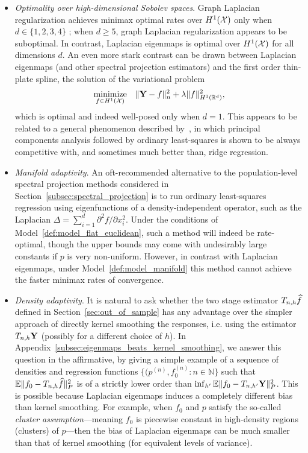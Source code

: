 \begin{itemize}
	\item \emph{Optimality over high-dimensional Sobolev spaces}. Graph Laplacian regularization achieves minimax optimal rates over $H^1(\mathcal{X})$ only when $d \in \{1,2,3,4\}$ \citep{sadhanala16, green2021}; when $d \geq 5$, graph Laplacian regularization appears to be suboptimal. In contrast, Laplacian eigenmaps is optimal over $H^1(\mathcal{X})$ for all dimensions $d$.  An even more stark contrast can be drawn between Laplacian eigenmaps (and other spectral projection estimators) and the first order thin-plate spline, the solution of the variational problem
	\begin{equation}
	\underset{f \in H^1(\mathcal{X})}{\textrm{minimize}} \quad  \|{\bf Y} - f\|_n^2 + \lambda \|f\|_{H^1(\mathbb{R}^d)}^2,
	\end{equation}
	which is optimal and indeed well-posed only when $d = 1$. This appears to be related to a general phenomenon described by~\cite{dhillon2013,dicker2017}, in which principal components analysis followed by ordinary least-squares is shown to be always competitive with, and sometimes much better than, ridge regression. 
	\item \emph{Manifold adaptivity}. An oft-recommended alternative to the population-level spectral projection methods considered in Section~\ref{subsec:spectral_projection} is to run ordinary least-squares regression using eigenfunctions of a density-independent operator, such as the Laplacian $\Delta = \sum_{i = 1}^{d} \partial^2f/\partial x_i^2$. Under the conditions of Model~\ref{def:model_flat_euclidean}, such a method will indeed be rate-optimal, though the upper bounds may come with undesirably large constants if $p$ is very non-uniform. However, in contrast with Laplacian eigenmaps, under Model~\ref{def:model_manifold} this method cannot achieve the faster minimax rates of convergence.
	\item \emph{Density adaptivity}. It is natural to ask whether the two stage estimator $T_{n,h}\widehat{f}$ defined in Section~\ref{sec:out_of_sample} has any advantage over the simpler approach of directly kernel smoothing the responses, i.e. using the estimator $T_{n,h}{\bf Y}$ (possibly for a different choice of $h$). In Appendix~\ref{subsec:eigenmaps_beats_kernel_smoothing}, we answer this question in the affirmative, by giving a simple example of a sequence of densities and regression functions $\{(p^{(n)}, f_0^{(n)}: n \in \mathbb{N}\}$ such that $\mathbb{E}\|f_0 - T_{n,h}\widehat{f}\|_P^2$ is of a strictly lower order than $\inf_{h'} \mathbb{E}\|f_0 - T_{n,h'}{\bf Y}\|_P^2$. This is possible because Laplacian eigenmaps induces a completely different bias than kernel smoothing. For example, when $f_0$ and $p$ satisfy the so-called \emph{cluster assumption}---meaning $f_0$ is piecewise constant in high-density regions (clusters) of $p$---then the bias of Laplacian eigenmaps can be much smaller than that of kernel smoothing (for equivalent levels of variance). 
	

\end{itemize}
